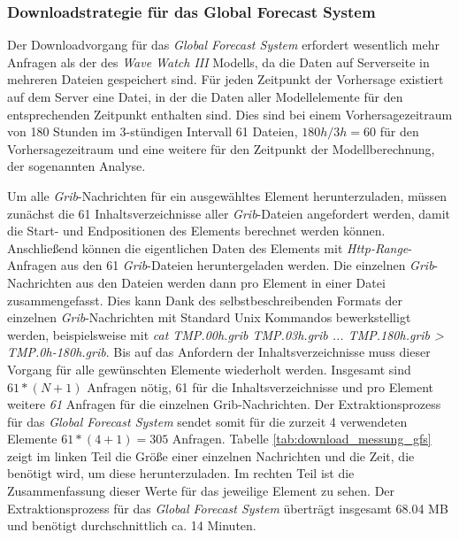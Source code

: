 \subsubsection{Downloadstrategie für das Global Forecast System}
Der Downloadvorgang für das \textit{Global Forecast System} erfordert
wesentlich mehr Anfragen als der des \textit{Wave Watch III} Modells,
da die Daten auf Serverseite in mehreren Dateien gespeichert sind. Für
jeden Zeitpunkt der Vorhersage existiert auf dem Server eine Datei, in
der die Daten aller Modellelemente für den entsprechenden Zeitpunkt
enthalten sind. Dies sind bei einem Vorhersagezeitraum von 180 Stunden
im 3-stündigen Intervall 61 Dateien, $180h / 3h = 60$ für den
Vorhersagezeitraum und eine weitere für den Zeitpunkt der
Modellberechnung, der sogenannten Analyse.

Um alle \textit{Grib}-Nachrichten für ein ausgewähltes Element
herunterzuladen, müssen zunächst die 61 Inhaltsverzeichnisse aller
\textit{Grib}-Dateien angefordert werden, damit die Start- und
Endpositionen des Elements berechnet werden können. Anschließend
können die eigentlichen Daten des Elements mit
\textit{Http-Range}-Anfragen aus den 61 \textit{Grib}-Dateien
heruntergeladen werden. Die einzelnen \textit{Grib}-Nachrichten aus
den Dateien werden dann pro Element in einer Datei
zusammengefasst. Dies kann Dank des selbstbeschreibenden Formats der
einzelnen \textit{Grib}-Nachrichten mit Standard Unix Kommandos
bewerkstelligt werden, beispielsweise mit \textit{cat TMP.00h.grib
  TMP.03h.grib ... TMP.180h.grib > TMP.0h-180h.grib}. Bis auf das
Anfordern der Inhaltsverzeichnisse muss dieser Vorgang für alle
gewünschten Elemente wiederholt werden. Insgesamt sind $ 61 * (N+1) $
Anfragen nötig, 61 für die Inhaltsverzeichnisse und pro Element
weitere \textit{61} Anfragen für die einzelnen Grib-Nachrichten. Der
Extraktionsprozess für das \textit{Global Forecast System} sendet
somit für die zurzeit 4 verwendeten Elemente $ 61 * (4+1) = 305$
Anfragen. Tabelle \ref{tab:download_messung_gfs} zeigt im linken Teil
die Größe einer einzelnen Nachrichten und die Zeit, die benötigt wird,
um diese herunterzuladen. Im rechten Teil ist die Zusammenfassung
dieser Werte für das jeweilige Element zu sehen. Der
Extraktionsprozess für das \textit{Global Forecast System} überträgt
insgesamt 68.04 MB und benötigt durchschnittlich ca. 14 Minuten.

